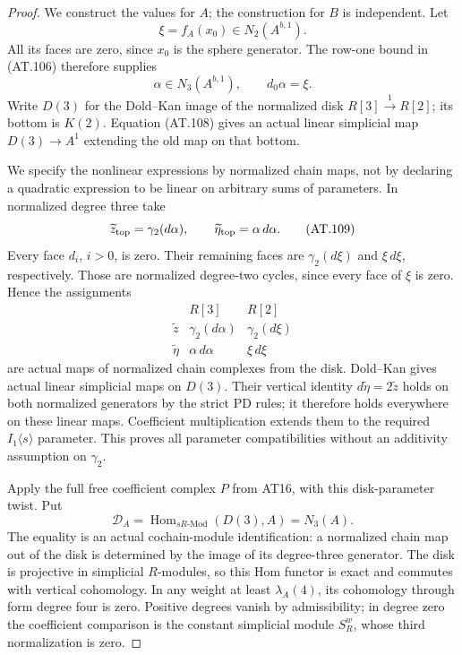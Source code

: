 \begin{proof}
We construct the values for $A$; the construction for $B$
is independent. Let
\[
                  \xi=f_A(x_0)\in N_2(A^{b,1}).
\]
All its faces are zero, since $x_0$ is the sphere generator.
The row-one bound in (AT.106) therefore supplies
\[
             \alpha\in N_3(A^{b,1}),\qquad d_0\alpha=\xi.
 \tag{AT.108}
\]
Write $D(3)$ for the Dold--Kan image of the normalized
disk $R[3]\xrightarrow{1}R[2]$; its bottom is $K(2)$.
Equation (AT.108) gives an actual linear simplicial map
$D(3)\to A^1$ extending the old map on that bottom.

We specify the nonlinear expressions by normalized chain
maps, not by declaring a quadratic expression to be linear
on arbitrary sums of parameters. In normalized degree three
take
\[
              \widetilde z_{\rm top}=\gamma_2(d\alpha),
                 \qquad
              \widetilde\eta_{\rm top}=\alpha\,d\alpha.
 \tag{AT.109}
\]
Every face $d_i$, $i>0$, is zero. Their remaining faces are
$\gamma_2(d\xi)$ and $\xi\,d\xi$, respectively.
Those are normalized degree-two cycles, since every face
of $\xi$ is zero. Hence the assignments
\[
 \begin{array}{c|cc}
 &R[3]&R[2]\\\hline
 \widetilde z&\gamma_2(d\alpha)&\gamma_2(d\xi)\\
 \widetilde\eta&\alpha\,d\alpha&\xi\,d\xi
 \end{array}
 \tag{AT.110}
\]
are actual maps of normalized chain complexes from the disk.
Dold--Kan gives actual linear simplicial maps on $D(3)$.
Their vertical identity $d\widetilde\eta=2\widetilde z$
holds on both normalized generators by the strict PD rules;
it therefore holds everywhere on these linear maps.
Coefficient multiplication extends them to the required
$I_1\langle s\rangle$ parameter. This proves all parameter
compatibilities without an additivity assumption on $\gamma_2$.

Apply the full free coefficient complex $P$ from AT16,
with this disk-parameter twist. Put
\[
          \mathcal D_A=\operatorname{Hom}_{sR\text{-}\mathrm{Mod}}
                                      (D(3),A)=N_3(A).
 \tag{AT.111}
\]
The equality is an actual cochain-module identification:
a normalized chain map out of the disk is determined by
the image of its degree-three generator.
The disk is projective in simplicial $R$-modules, so this
Hom functor is exact and commutes with vertical cohomology.
In any weight at least $\lambda_A(4)$, its cohomology
through form degree four is zero. Positive degrees vanish
by admissibility; in degree zero the coefficient comparison
is the constant simplicial module $S_R^w$, whose third
normalization is zero.


\end{proof}
